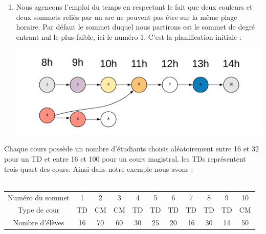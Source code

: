 \documentclass[a4paper,11pt]{article}
\begin{document}
\begin{enumerate}
				\item Nous agencons l'emploi du temps en respectant le fait que deux couleurs et deux sommets reliés par un arc ne peuvent pas être sur la même plage horaire. Par défaut le sommet duquel nous partirons est le sommet de degré entrant nul le plus faible, ici le numéro 1. C'est la planification initiale :
				\\
				\centerline{\includegraphics[scale=0.8]{Captures/exemple4.png}}
			\end{enumerate}
			Chaque cours possède un nombre d'étudiants choisis aléatoirement entre 16 et 32 pour un TD et entre 16 et 100 pour un cours magistral. les TDs représentent trois quart des cours. Ainsi dans notre exemple nous avons : \\
			\\
			\begin{tabular}{ | c | c | c | c | c | c | c | c | c | c | c |}
 				\hline			
   				Numéro du sommet & 1 & 2 & 3 & 4 & 5 & 6 & 7 & 8 & 9 & 10\\
   				Type de cour & TD & CM & CM & TD & TD & TD & TD & TD & TD & CM \\
   				Nombre d'élèves & 16 & 70 & 60 & 30 & 25 & 20 & 16 & 30 & 14 & 50\\
 				\hline  
 			\end{tabular}\\
\end{document}
